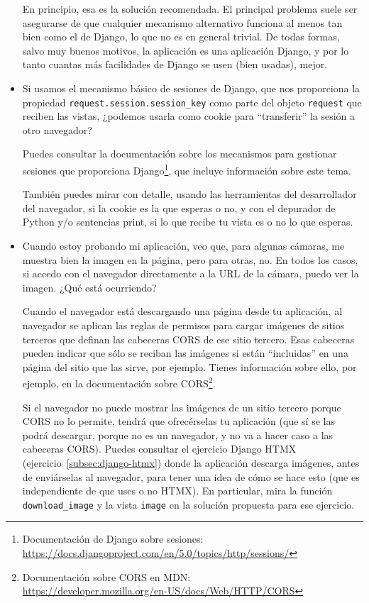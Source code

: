 \begin{itemize}
  En principio, esa es la solución recomendada. El principal problema suele ser asegurarse de que cualquier mecanismo alternativo funciona al menos tan bien como el de Django, lo que no es en general trivial. De todas formas, salvo muy buenos motivos, la aplicación es una aplicación Django, y por lo tanto cuantas más facilidades de Django se usen (bien usadas), mejor.

\item Si usamos el mecanismo básico de sesiones de Django, que nos proporciona la propiedad \texttt{request.session.session_key} como parte del objeto \texttt{request} que reciben las vistas, ¿podemos usarla como cookie para ``transferir'' la sesión a otro navegador?

  Puedes consultar la documentación sobre los mecanismos para gestionar sesiones que proporciona Django\footnote{Documentación de Django sobre sesiones:\\
    \url{https://docs.djangoproject.com/en/5.0/topics/http/sessions/}}, que incluye información sobre este tema.

  También puedes mirar con detalle, usando las herramientas del desarrollador del navegador, si la cookie es la que esperas o no, y con el depurador de Python y/o sentencias print, si lo que recibe tu vista es o no lo que esperas.

\item Cuando estoy probando mi aplicación, veo que, para algunas cámaras, me muestra bien la imagen en la página, pero para otras, no. En todos los casos, si accedo con el navegador directamente a la URL de la cámara, puedo ver la imagen. ¿Qué está ocurriendo?

  Cuando el navegador está descargando una página desde tu aplicación, al navegador se aplican las reglas de permisos para cargar imágenes de sitios terceros que definan las cabeceras CORS de ese sitio tercero. Esas cabeceras pueden indicar que sólo se reciban las imágenes si están ``incluidas'' en una página del sitio que las sirve, por ejemplo. Tienes información sobre ello, por ejemplo, en la documentación sobre CORS\footnote{Documentación sobre CORS en MDN: \\
    \url{https://developer.mozilla.org/en-US/docs/Web/HTTP/CORS}}.

  Si el navegador no puede mostrar las imágenes de un sitio tercero porque CORS no lo permite, tendrá que ofrecérselas tu aplicación (que sí se las podrá descargar, porque no es un navegador, y no va a hacer caso a las cabeceras CORS). Puedes consultar el ejercicio Django HTMX (ejercicio~\ref{subsec:django-htmx}) donde la aplicación descarga imágenes, antes de enviárselas al navegador, para tener una idea de cómo se hace esto (que es independiente de que uses o no HTMX). En particular, mira la función \texttt{download\_image} y la vista \texttt{image} en la solución propuesta para ese ejercicio.
  

\end{itemize}
